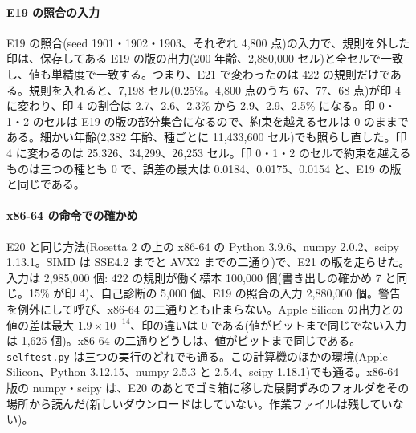 \paragraph{E19 の照合の入力}
E19 の照合(seed 1901・1902・1903、それぞれ 4{,}800 点)の入力で、規則を外した印は、保存してある E19 の版の出力(200 年齢、2{,}880{,}000 セル)と全セルで一致し、値も単精度で一致する。つまり、E21 で変わったのは 422 の規則だけである。規則を入れると、7{,}198 セル(0.25\%。4{,}800 点のうち 67、77、68 点)が印 4 に変わり、印 4 の割合は 2.7、2.6、2.3\% から 2.9、2.9、2.5\% になる。印 0・1・2 のセルは E19 の版の部分集合になるので、約束を越えるセルは 0 のままである。細かい年齢(2{,}382 年齢、種ごとに 11{,}433{,}600 セル)でも照らし直した。印 4 に変わるのは 25{,}326、34{,}299、26{,}253 セル。印 0・1・2 のセルで約束を越えるものは三つの種とも 0 で、誤差の最大は 0.0184、0.0175、0.0154 と、E19 の版と同じである。

\paragraph{x86-64 の命令での確かめ}
E20 と同じ方法(Rosetta 2 の上の x86-64 の Python 3.9.6、numpy 2.0.2、scipy 1.13.1。SIMD は SSE4.2 までと AVX2 までの二通り)で、E21 の版を走らせた。入力は 2{,}985{,}000 個: 422 の規則が働く標本 100{,}000 個(書き出しの確かめ 7 と同じ。15\% が印 4)、自己診断の 5{,}000 個、E19 の照合の入力 2{,}880{,}000 個。警告を例外にして呼び、x86-64 の二通りとも止まらない。Apple Silicon の出力との値の差は最大 $1.9\times10^{-14}$、印の違いは 0 である(値がビットまで同じでない入力は 1{,}625 個)。x86-64 の二通りどうしは、値がビットまで同じである。\texttt{selftest.py} は三つの実行のどれでも通る。この計算機のほかの環境(Apple Silicon、Python 3.12.15、numpy 2.5.3 と 2.5.4、scipy 1.18.1)でも通る。x86-64 版の numpy・scipy は、E20 のあとでゴミ箱に移した展開ずみのフォルダをその場所から読んだ(新しいダウンロードはしていない。作業ファイルは残していない)。

